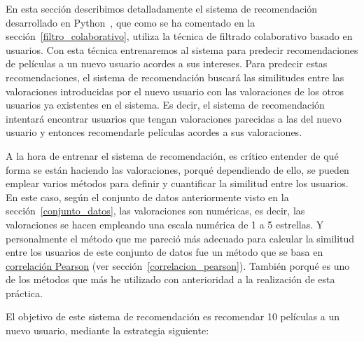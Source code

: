 \documentclass{uimppracticas}
\begin{document}
En esta sección describimos detalladamente el sistema de recomendación desarrollado en Python~\cite{GitHubRepo}, que como se ha comentado en la sección~\ref{filtro_colaborativo}, utiliza la técnica de filtrado colaborativo basado en usuarios. Con esta técnica entrenaremos al sistema para predecir recomendaciones de películas a un nuevo usuario acordes a sus intereses. Para predecir estas recomendaciones, el sistema de recomendación buscará las similitudes entre las valoraciones introducidas por el nuevo usuario con las valoraciones de los otros usuarios ya existentes en el sistema. Es decir, el sistema de recomendación intentará encontrar usuarios que tengan valoraciones parecidas a las del nuevo usuario y entonces recomendarle películas acordes a sus valoraciones. 

A la hora de entrenar el sistema de recomendación, es crítico entender de qué forma se están haciendo las valoraciones, porqué dependiendo de ello, se pueden emplear varios métodos para definir y cuantificar la similitud entre los usuarios. En este caso, según el conjunto de datos anteriormente visto en la sección~\ref{conjunto_datos}, las valoraciones son numéricas, es decir, las valoraciones se hacen empleando una escala numérica de 1 a 5 estrellas. Y personalmente el método que me pareció más adecuado para calcular la similitud entre los usuarios de este conjunto de datos fue un método que se basa en \href{https://es.wikipedia.org/wiki/Coeficiente_de_correlaci\%C3\%B3n_de_Pearson}{correlación Pearson} (ver sección~\ref{correlacion_pearson}). También porqué es uno de los métodos que más he utilizado con anterioridad a la realización de esta práctica.

El objetivo de este sistema de recomendación es recomendar 10 películas a un nuevo usuario, mediante la estrategia siguiente:
\end{document}
